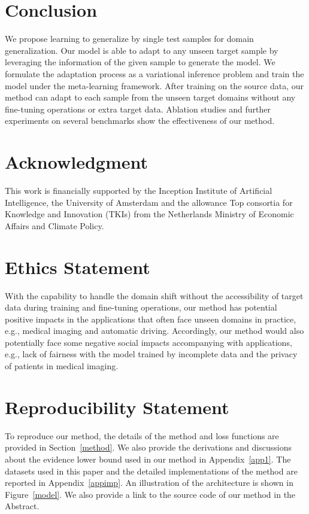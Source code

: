 \documentclass{article} \usepackage[table]{xcolor}
\begin{document}
\vspace{-2mm}
\section{Conclusion}
\vspace{-1mm}
We propose learning to generalize by single test samples for domain generalization.
Our model is able to adapt to any unseen target sample by leveraging the information of the given sample to generate the model.
We formulate the adaptation process as a variational inference problem and train the model under the meta-learning framework.
After training on the source data, our method can adapt to each sample from the unseen target domains without any fine-tuning operations or extra target data. Ablation studies and further experiments on several benchmarks show the effectiveness of our method.


\section*{Acknowledgment}
This work is financially supported by the Inception Institute of Artificial Intelligence, the University of Amsterdam and the allowance 
Top consortia for Knowledge and Innovation (TKIs) from the Netherlands Ministry of Economic Affairs and Climate Policy.




\section*{Ethics Statement}


With the capability to handle the domain shift without the accessibility of target data during training and fine-tuning operations, our method has potential positive impacts in the applications that often face unseen domains in practice, e.g., medical imaging and automatic driving.
Accordingly, our method would also potentially face some negative social impacts accompanying with applications, e.g., lack of fairness with the model trained by incomplete data and the privacy of patients in medical imaging.


\section*{Reproducibility Statement}
To reproduce our method, the details of the method and loss functions are provided in Section~\ref{method}. 
We also provide the derivations and discussions about the evidence lower bound used in our method in Appendix~\ref{app1}.
The datasets used in this paper and the detailed implementations of the method are reported in Appendix~\ref{appimp}. An illustration of the architecture is shown in Figure~\ref{model}.
We also provide a link to the source code of our method in the Abstract.
\end{document}
